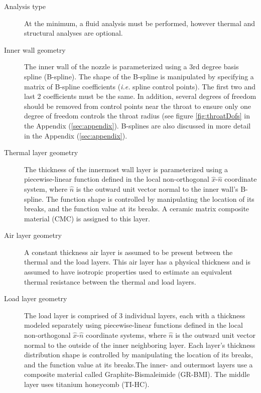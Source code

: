 \documentclass{article}
\begin{document}
\begin{description}
\item[Analysis type] At the minimum, a fluid analysis must be performed, however thermal and structural analyses are optional.

\item[Inner wall geometry] The inner wall of the nozzle is parameterized using a 3rd degree basis spline (B-spline). The shape of the B-spline is manipulated by specifying a matrix of B-spline coefficients (\textit{i.e.} spline control points). The first two and last 2 coefficients must be the same. In addition, several degrees of freedom should be removed from control points near the throat to ensure only one degree of freedom controls the throat radius (see figure \ref{fig:throatDofs} in the Appendix (\ref{sec:appendix}). B-splines are also discussed in more detail in the Appendix (\ref{sec:appendix}).

\item[Thermal layer geometry] The thickness of the innermost wall layer is parameterized using a piecewise-linear function defined in the local non-orthogonal $\hat{x}$-$\hat{n}$ coordinate system, where $\hat{n}$ is the outward unit vector normal to the inner wall's B-spline. The function shape is controlled by manipulating the location of its breaks, and the function value at its breaks. A ceramic matrix composite material (CMC) is assigned to this layer.

\item[Air layer geometry] A constant thickness air layer is assumed to be present between the thermal and the load layers. This air layer has a physical thickness and is assumed to have isotropic properties used to estimate an equivalent thermal resistance between the thermal and load layers.

\item[Load layer geometry] The load layer is comprised of 3 individual layers, each with a thickness modeled separately using piecewise-linear functions defined in the local non-orthogonal $\hat{x}$-$\hat{n}$ coordinate systems, where $\hat{n}$ is the outward unit vector normal to the outside of the inner neighboring layer. Each layer's thickness distribution shape is controlled by manipulating the location of its breaks, and the function value at its breaks.The inner- and outermost layers use a composite material called Graphite-Bismaleimide (GR-BMI). The middle layer uses titanium honeycomb (TI-HC).


\end{description}
\end{document}
